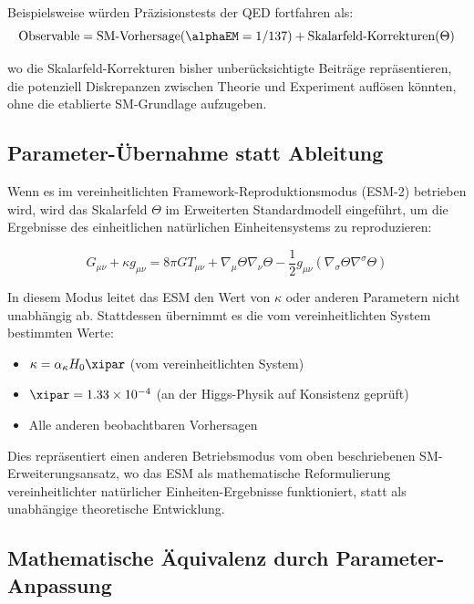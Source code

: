 	Beispielsweise würden Präzisionstests der QED fortfahren als:
	\begin{equation}
		\text{Observable} = \text{SM-Vorhersage}(\alphaEM = 1/137) + \text{Skalarfeld-Korrekturen}(\Theta)
	\end{equation}
	
	wo die Skalarfeld-Korrekturen bisher unberücksichtigte Beiträge repräsentieren, die potenziell Diskrepanzen zwischen Theorie und Experiment auflösen könnten, ohne die etablierte SM-Grundlage aufzugeben.
	
	\subsection{Parameter-Übernahme statt Ableitung}
	\label{subsec:parameter_adoption}
	
	Wenn es im vereinheitlichten Framework-Reproduktionsmodus (ESM-2) betrieben wird, wird das Skalarfeld $\Theta$ im Erweiterten Standardmodell eingeführt, um die Ergebnisse des einheitlichen natürlichen Einheitensystems zu reproduzieren:
	
	\begin{equation}
		G_{\mu\nu} + \kappa g_{\mu\nu} = 8\pi G T_{\mu\nu} + \nabla_{\mu}\Theta\nabla_{\nu}\Theta - \frac{1}{2}g_{\mu\nu}(\nabla_{\sigma}\Theta\nabla^{\sigma}\Theta)
	\end{equation}
	
	In diesem Modus leitet das ESM den Wert von $\kappa$ oder anderen Parametern nicht unabhängig ab. Stattdessen übernimmt es die vom vereinheitlichten System bestimmten Werte:
	
	\begin{itemize}
		\item $\kappa = \alpha_\kappa H_0 \xipar$ (vom vereinheitlichten System)
		\item $\xipar = 1.33 \times 10^{-4}$ (an der Higgs-Physik auf Konsistenz geprüft)
		\item Alle anderen beobachtbaren Vorhersagen
	\end{itemize}
	
	Dies repräsentiert einen anderen Betriebsmodus vom oben beschriebenen SM-Erweiterungsansatz, wo das ESM als mathematische Reformulierung vereinheitlichter natürlicher Einheiten-Ergebnisse funktioniert, statt als unabhängige theoretische Entwicklung.
	
	\subsection{Mathematische Äquivalenz durch Parameter-Anpassung}
	\label{subsec:mathematical_equivalence_parameters}
	
